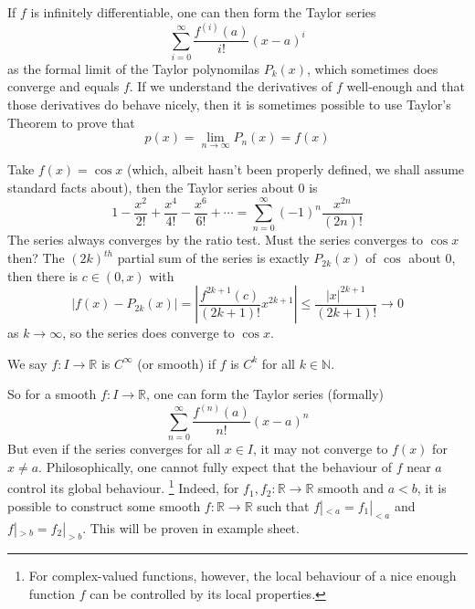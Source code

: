 If $f$ is infinitely differentiable, one can then form the Taylor series
$$\sum_{i=0}^\infty\frac{f^{(i)}(a)}{i!}(x-a)^i$$
as the formal limit of the Taylor polynomilas $P_k(x)$, which sometimes does converge and equals $f$.
If we understand the derivatives of $f$ well-enough and that those derivatives do behave nicely, then it is sometimes possible to use Taylor's Theorem to prove that
$$p(x)=\lim_{n\to\infty}P_n(x)=f(x)$$
\begin{example}
    Take $f(x)=\cos x$ (which, albeit hasn't been properly defined, we shall assume standard facts about), then the Taylor series about $0$ is
    $$1-\frac{x^2}{2!}+\frac{x^4}{4!}-\frac{x^6}{6!}+\cdots=\sum_{n=0}^\infty(-1)^n\frac{x^{2n}}{(2n)!}$$
    The series always converges by the ratio test.
    Must the series converges to $\cos x$ then?
    The $(2k)^{th}$ partial sum of the series is exactly $P_{2k}(x)$ of $\cos$ about $0$, then there is $c\in (0,x)$ with
    $$|f(x)-P_{2k}(x)|=\left|\frac{f^{2k+1}(c)}{(2k+1)!}x^{2k+1}\right|\le\frac{|x|^{2k+1}}{(2k+1)!}\to 0$$
    as $k\to\infty$, so the series does converge to $\cos x$.
\end{example}
\begin{definition}
    We say $f:I\to\mathbb R$ is $C^\infty$ (or smooth) if $f$ is $C^k$ for all $k\in\mathbb N$.
\end{definition}
So for a smooth $f:I\to\mathbb R$, one can form the Taylor series (formally)
$$\sum_{n=0}^\infty\frac{f^{(n)}(a)}{n!}(x-a)^n$$
But even if the series converges for all $x\in I$, it may not converge to $f(x)$ for $x\neq a$.
Philosophically, one cannot fully expect that the behaviour of $f$ near $a$ control its global behaviour.
\footnote{For complex-valued functions, however, the local behaviour of a nice enough function $f$ can be controlled by its local properties.}
Indeed, for $f_1,f_2:\mathbb R\to\mathbb R$ smooth and $a<b$, it is possible to construct some smooth $f:\mathbb R\to\mathbb R$ such that $f|_{<a}=f_1|_{<a}$ and $f|_{>b}=f_2|_{>b}$.
This will be proven in example sheet.
